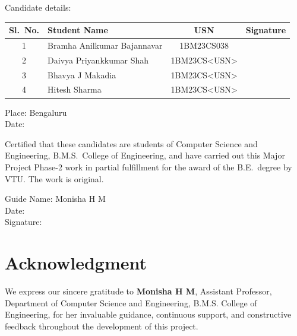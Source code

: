 \documentclass[12pt,a4paper]{report}
\begin{document}
\vspace{0.3cm}
\begin{flushleft}Candidate details:\end{flushleft}
\begin{center}
\renewcommand{\arraystretch}{1.3}
\begin{tabular}{|c|l|c|c|}
\hline
\textbf{Sl.~No.} & \textbf{Student Name} & \textbf{USN} & \textbf{Signature} \\
\hline
1 & Bramha Anilkumar Bajannavar & 1BM23CS038 & \\
\hline
2 & Daivya Priyankkumar Shah & 1BM23CS\textless USN\textgreater & \\
\hline
3 & Bhavya J Makadia & 1BM23CS\textless USN\textgreater & \\
\hline
4 & Hitesh Sharma & 1BM23CS\textless USN\textgreater & \\
\hline
\end{tabular}
\end{center}

\begin{flushleft}
Place: Bengaluru \\
Date:
\end{flushleft}

Certified that these candidates are students of Computer Science and Engineering, B.M.S.\ College of Engineering, and have carried out this Major Project Phase-2 work in partial fulfillment for the award of the B.E.\ degree by VTU. The work is original.

\vspace{1cm}
\begin{flushleft}
Guide Name: Monisha H M \\
Date: \\
Signature:
\end{flushleft}

\chapter*{Acknowledgment}
\thispagestyle{empty}

We express our sincere gratitude to \textbf{Monisha H M}, Assistant Professor, Department of Computer Science and Engineering, B.M.S. College of Engineering, for her invaluable guidance, continuous support, and constructive feedback throughout the development of this project.
\end{document}

